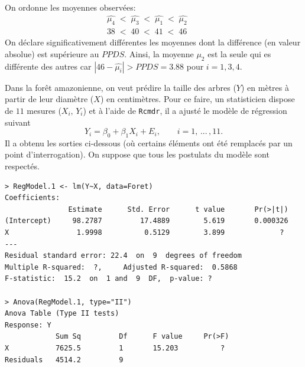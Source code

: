 \begin{questions}
\begin{parts}
\begin{solution}\\
    On ordonne les moyennes observées:
\begin{eqnarray*}
   \hat{\mu_4} \; < \; \hat{\mu_3} \; < \; \hat{\mu_1} \; < \; \hat{\mu_2}&&  \\
   38 \; < \; 40 \; < \; 41 \; < \; 46 &&  
\end{eqnarray*}
On déclare significativement différentes les moyennes dont la différence (en valeur absolue) est supérieure au $PPDS$.
Ainsi, la moyenne $\mu_2$ est la seule qui es différente des autres car $|46 -  \hat{\mu_i}| > PPDS= 3.88$ pour $i=1,3,4$.

\end{solution}
\end{parts}

\newpage

\question\label{RegSimple} 
Dans la forêt amazonienne, on veut prédire la taille des arbres ($Y$) en mètres à partir de leur diamètre ($X$) en centimètres. Pour ce faire, un statisticien dispose de $11$ mesures ($X_i,\,Y_i$) et à l'aide de \texttt{Rcmdr}, il a ajusté le modèle de régression suivant
$$Y_i=\beta_0+\beta_1X_i+E_i,\qquad i=1,\,...\,,11.$$
Il a obtenu les sorties ci-dessous (où certains éléments ont été remplacés par un point d'interrogation). On suppose que tous les postulats du modèle sont respectés.

\begin{verbatim}
> RegModel.1 <- lm(Y~X, data=Foret)
Coefficients:
               Estimate      Std. Error      t value       Pr(>|t|)
(Intercept)     98.2787         17.4889        5.619       0.000326
X                1.9998          0.5129        3.899             ?
---
Residual standard error: 22.4  on  9  degrees of freedom
Multiple R-squared:  ?, 	Adjusted R-squared:  0.5868
F-statistic:  15.2  on  1 and  9  DF,  p-value: ?

> Anova(RegModel.1, type="II")
Anova Table (Type II tests)
Response: Y
            Sum Sq         Df      F value     Pr(>F)
X           7625.5         1       15.203          ?
Residuals   4514.2         9
\end{verbatim}


\end{questions}
